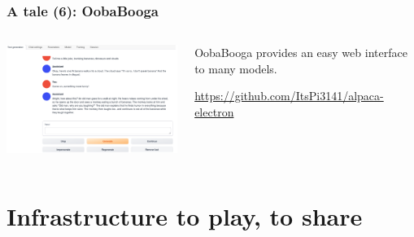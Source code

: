\documentclass[17pt,aspectratio=169,hyperref={pdfusetitle,colorlinks,allcolors=olive}]{beamer}
\begin{document}
\begin{frame}[fragile]
  \frametitle{A tale (6): OobaBooga}

  \begin{columns}[T]
    \begin{column}{.58\textwidth}
      \includegraphics[width=7.5cm]{figs/oobabooga}
    \end{column}%
    \hfill%
    \begin{column}{.38\textwidth}
      \vspace{1.5cm}

      OobaBooga provides an easy web interface to many models.
      
    {\scriptsize
      \url{https://github.com/ItsPi3141/alpaca-electron}
    }
    \end{column}%
  \end{columns}

\end{frame}

\section{Infrastructure to play, to share}
\end{document}
